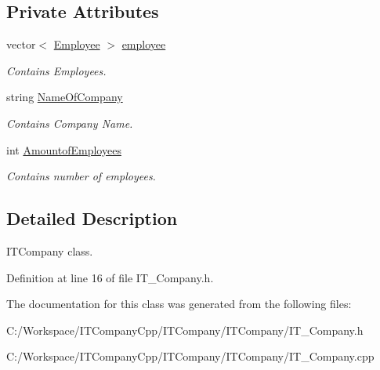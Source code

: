 \subsection*{Private Attributes}
\begin{DoxyCompactItemize}
\item 
\mbox{\label{class_i_t___company_a26c2bb58e3f36ccc1fcfeebe651a29d2}} 
vector$<$ \hyperlink{class_employee}{Employee} $>$ \hyperlink{class_i_t___company_a26c2bb58e3f36ccc1fcfeebe651a29d2}{employee}
\begin{DoxyCompactList}\small\item\em Contains Employees. \end{DoxyCompactList}\item 
\mbox{\label{class_i_t___company_a2c19371df703f0aa969aaf8bfba32874}} 
string \hyperlink{class_i_t___company_a2c19371df703f0aa969aaf8bfba32874}{Name\+Of\+Company}
\begin{DoxyCompactList}\small\item\em Contains Company Name. \end{DoxyCompactList}\item 
\mbox{\label{class_i_t___company_a5a839f7995a47589d983fd1990c06a0a}} 
int \hyperlink{class_i_t___company_a5a839f7995a47589d983fd1990c06a0a}{Amountof\+Employees}
\begin{DoxyCompactList}\small\item\em Contains number of employees. \end{DoxyCompactList}\end{DoxyCompactItemize}


\subsection{Detailed Description}
I\+T\+Company class. 

Definition at line 16 of file I\+T\+\_\+\+Company.\+h.



The documentation for this class was generated from the following files\+:\begin{DoxyCompactItemize}
\item 
C\+:/\+Workspace/\+I\+T\+Company\+Cpp/\+I\+T\+Company/\+I\+T\+Company/I\+T\+\_\+\+Company.\+h\item 
C\+:/\+Workspace/\+I\+T\+Company\+Cpp/\+I\+T\+Company/\+I\+T\+Company/I\+T\+\_\+\+Company.\+cpp\end{DoxyCompactItemize}
